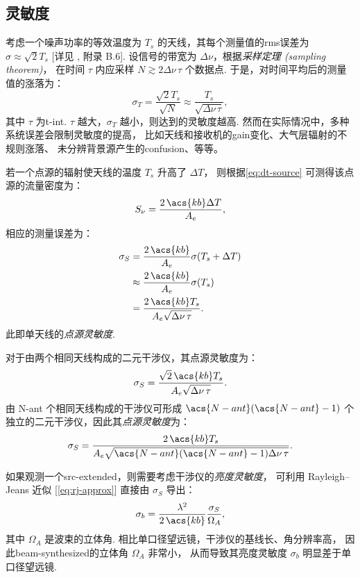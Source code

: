 \subsection{灵敏度}

考虑一个噪声功率的等效温度为 $T_s$ 的天线，其每个测量值的\ac{rms}误差为
$\sigma \approx \sqrt{2} T_s$
[详见 , 附录 B.6].
设信号的带宽为 $\Delta\nu$，根据\emph{采样定理 (sampling theorem)}，
在时间 $\tau$ 内应采样 $N \gtrsim 2 \Delta\nu \,\tau$ 个数据点.
于是，对时间平均后的测量值的涨落为：
\begin{equation}
  \label{eq:radiometer}
  \sigma_T = \frac{\sqrt{2} T_s}{\sqrt{N}}
    \approx \frac{T_s}{\sqrt{\Delta\nu \,\tau}} ,
\end{equation}
其中 $\tau$ 为\ac{t-int}.
$\tau$ 越大，$\sigma_T$ 越小，则达到的灵敏度越高.
然而在实际情况中，多种系统误差会限制灵敏度的提高，
比如天线和接收机的\ac{gain}变化、大气层辐射的不规则涨落、
未分辨背景源产生的\ac{confusion}、等等。

若一个点源的辐射使天线的温度 $T_s$ 升高了 $\Delta T$，
则根据\autoref{eq:dt-source} 可测得该点源的流量密度为：
\begin{equation}
  S_{\nu} = \frac{2\,\acs{kb} \Delta T}{A_e} ,
\end{equation}
相应的测量误差为：
\begin{align}
  \sigma_S
    & = \frac{2\,\acs{kb}}{A_e} \sigma(T_s + \Delta T) \\
    & \approx \frac{2\,\acs{kb}}{A_e} \sigma(T_s) \\
    & = \frac{2\,\acs{kb} T_s}{A_e \sqrt{\Delta\nu \,\tau}} .
\end{align}
此即单天线的\emph{点源灵敏度}.

对于由两个相同天线构成的二元干涉仪，其点源灵敏度为：
\begin{equation}
  \label{eq:sigma-ps1}
  \sigma_S = \frac{\sqrt{2}\,\acs{kb} T_s}{A_e \sqrt{\Delta\nu \,\tau}} .
\end{equation}
由 \acs{N-ant} 个相同天线构成的干涉仪可形成 $\acs{N-ant}(\acs{N-ant}-1)$
个独立的二元干涉仪，因此其\emph{点源灵敏度}为：
\begin{equation}
  \label{eq:sigma-ps}
  \sigma_S = \frac{2\,\acs{kb} T_s}{
    A_e \sqrt{\acs{N-ant}(\acs{N-ant}-1) \Delta\nu \,\tau}} .
\end{equation}

如果观测一个\acf{src-extended}，则需要考虑干涉仪的\emph{亮度灵敏度}，
可利用 Rayleigh--Jeans 近似 [\autoref{eq:rj-approx}]
直接由 $\sigma_S$ 导出：
\begin{equation}
  \label{eq:sigma-tb}
  \sigma_b = \frac{\lambda^2}{2\,\acs{kb}} \frac{\sigma_S}{\Omega_A} ,
\end{equation}
其中 $\Omega_A$ 是波束的立体角.
相比单口径望远镜，干涉仪的基线长、角分辨率高，
因此\ac{beam-synthesized}的立体角 $\Omega_A$ 非常小，
从而导致其亮度灵敏度 $\sigma_b$ 明显差于单口径望远镜.


